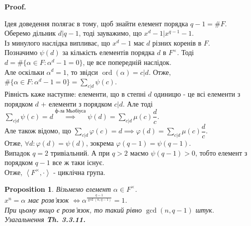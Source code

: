 \documentclass[a4paper, 14pt]{extarticle}
\makeatletter
\theoremstyle{theoremdd}
\theoremstyle{theoremdd}
\theoremstyle{theoremdd}
\theoremstyle{theoremdd}
\theoremstyle{theoremdd}
\newtheorem{proposition}[theorem]{Proposition}
\theoremstyle{theoremdd}
\theoremstyle{theoremdd}
\theoremstyle{theoremdd}
\def\qed{$\blacksquare$}
\renewenvironment{proof}[1][Proof.\\]{\par
\pushQED{\hfill \qed}%
\normalfont \topsep6\p@\@plus6\p@\relax
\trivlist
\item\relax
{\bfseries
#1\@addpunct{.}}\hspace\labelsep\ignorespaces
}{%
\popQED\endtrivlist\@endpefalse
}
\DeclareMathOperator{\ord}{ord}
\makeatother
\begin{document}
\begin{proof}
Ідея доведення полягає в тому, щоб знайти елемент порядка $q-1 = \# F$.\\
Оберемо дільник $d | q-1$, тоді зауважимо, що $x^d -1 | x^{q-1}-1$.\\
\iffalse %
Дійсно, $x^{q-1} - 1 = x^{dd'}-1 = (x^d)^{d'} - 1 = (x^d-1)((x^{d})^{d'-1} + \dots + x^d + 1)$.
\fi
Із минулого наслідка випливає, що $x^d - 1$ має $d$ різних коренів в $F$.\\
Позначимо $\psi(d)$ за кількість елементів порядка $d$ в $F^\times$. Тоді\\
$d = \# \{ \alpha \in F: \alpha^d - 1 = 0 \}$, це все попередній наслідок.\\
Але оскільки $\alpha^d = 1$, то звідси $\ord(\alpha) = c | d$. Отже,\\
$\# \{\alpha \in F: \alpha^d - 1 = 0\} = \displaystyle\sum_{c | d} \psi(c)$.\\
Рівність каже наступне: елементи, що в степні $d$ одиницю - це всі елементи з порядком $d$ + елементи з порядком $c | d$. Але тоді\\
$\displaystyle\sum_{c | d} \psi(c) = d \overset{\text{ф-ла Мьобіуса}}{\implies} \psi(d) = \sum_{c | d} \mu(c) \dfrac{d}{c}$.\\
Але також відомо, що $\displaystyle\sum_{c | d} \varphi(c) =d \implies \varphi(d) = \sum_{c | d} \mu(c) \dfrac{d}{c}$.\\
Отже, $\forall d: \varphi(d) = \psi(d)$, зокрема $\varphi(q-1) = \psi(q-1)$.\\
Випадок $q = 2$ тривіальний. А при $q > 2$ маємо $\psi(q-1) > 0$, тобто елемент з порядком $q-1$ все ж таки існує.\\
Отже, $\left< F^\times, \cdot \right>$ - циклічна група.
\end{proof}

\begin{proposition}
Візьмемо елемент $\alpha \in F^\times$.\\
$x^n = \alpha$ має розв'язок $\iff \alpha^{\frac{q-1}{\gcd(n,q-1)}} = 1$.\\
При цьому якщо є розв'язок, то такий рівно $\gcd(n,q-1)$ штук.\\
\textit{Узагальнення \textbf{Th. 3.3.11.}}
\end{proposition}
\end{document}
